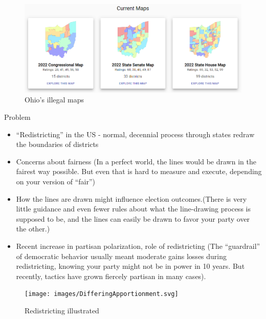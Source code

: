 \documentclass[
  ignorenonframetext,
]{beamer}
\begin{document}
\begin{frame}{}
\protect\hypertarget{section-1}{}
\begin{figure}
\centering
\includegraphics{images/ohio_current.png}
\caption{Ohio's illegal maps}
\end{figure}
\end{frame}

\begin{frame}{Problem}
\protect\hypertarget{problem-1}{}
\begin{itemize}
\item
  ``Redistricting'' in the US - normal, decennial process through states
  redraw the boundaries of districts
\item
  Concerns about fairness (In a perfect world, the lines would be drawn
  in the fairest way possible. But even that is hard to measure and
  execute, depending on your version of ``fair'')
\item
  How the lines are drawn might influence election outcomes.(There is
  very little guidance and even fewer rules about what the line-drawing
  process is supposed to be, and the lines can easily be drawn to favor
  your party over the other.)
\item
  Recent increase in partisan polarization, role of redistricting (The
  ``guardrail'' of democratic behavior usually meant moderate gains
  losses during redistricting, knowing your party might not be in power
  in 10 years. But recently, tactics have grown fiercely partisan in
  many cases).
\end{itemize}
\end{frame}

\begin{frame}{}
\protect\hypertarget{section-2}{}
\begin{figure}
\centering
\texttt{[image: images/DifferingApportionment.svg]}
\caption{Redistricting illustrated}
\end{figure}
\end{frame}
\end{document}
